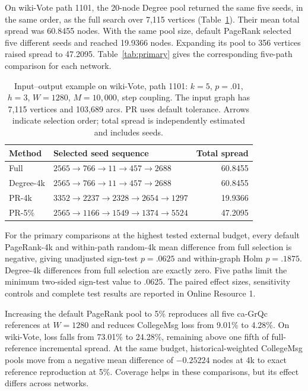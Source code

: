 \documentclass[smallextended]{svjour3}
\newcommand{\CollegePRLoss}{9.01}
\newcommand{\CollegePRfiveLoss}{4.28}
\newcommand{\WikiPRLoss}{73.01}
\newcommand{\WikiPRfiveLoss}{24.28}
\begin{document}
On wiki-Vote path 1101, the 20-node Degree pool returned the same five seeds, in the same order, as the full search over 7,115 vertices (Table~\ref{tab:case}). Their mean total spread was 60.8455 nodes. With the same pool size, default PageRank selected five different seeds and reached 19.9366 nodes. Expanding its pool to 356 vertices raised spread to 47.2095. Table~\ref{tab:primary} gives the corresponding five-path comparison for each network.
\begin{table}[htbp]
\caption{Input--output example on wiki-Vote, path 1101: $k=5$, $p=.01$, $h=3$, $W=1280$, $M=10,000$, step coupling. The input graph has 7,115 vertices and 103,689 arcs. PR uses default tolerance. Arrows indicate selection order; total spread is independently estimated and includes seeds.}\label{tab:case}
\begin{tabularx}{\linewidth}{lXr}\toprule
Method & Selected seed sequence & Total spread \\ \midrule
Full & $2565\to 766\to 11\to 457\to 2688$ & 60.8455 \\
Degree-4k & $2565\to 766\to 11\to 457\to 2688$ & 60.8455 \\
PR-4k & $3352\to 2237\to 2328\to 2654\to 1297$ & 19.9366 \\
PR-5\% & $2565\to 1166\to 1549\to 1374\to 5524$ & 47.2095 \\
\bottomrule\end{tabularx}
\end{table}

For the primary comparisons at the highest tested external budget, every default PageRank-4k and within-path random-4k mean difference from full selection is negative, giving unadjusted sign-test $p=.0625$ and within-graph Holm $p=.1875$. Degree-4k differences from full selection are exactly zero. Five paths limit the minimum two-sided sign-test value to .0625. The paired effect sizes, sensitivity controls and complete test results are reported in Online Resource 1.

Increasing the default PageRank pool to 5\% reproduces all five ca-GrQc references at $W=1280$ and reduces CollegeMsg loss from \CollegePRLoss{}\% to \CollegePRfiveLoss{}\%. On wiki-Vote, loss falls from \WikiPRLoss{}\% to \WikiPRfiveLoss{}\%, remaining above one fifth of full-reference incremental spread. At the same budget, historical-weighted CollegeMsg pools move from a negative mean difference of $-0.25224$ nodes at 4k to exact reference reproduction at 5\%. Coverage helps in these comparisons, but its effect differs across networks.
\end{document}
